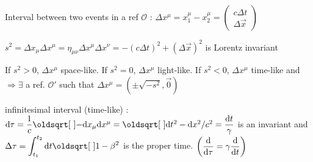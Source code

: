 \columnbreak
{}
\begin{squishlist}
\item Interval between two events in a ref $\mathcal{O}$ : $ \Delta x^{\mu} = x_1^{\mu} - x_2^{\mu} = \begin{pmatrix}
    c\Delta t \\
    \Delta \vec{x}
\end{pmatrix}$ 

\item $s^2 = \Delta x_\mu \Delta x^\mu = \eta_{\mu\nu} \Delta x^{\mu}\Delta x^{\nu} = -(c\Delta t)^2 + (\Delta \Vec{x})^2$ is Lorentz invariant

\item If $s^2>0$, $\Delta x^\mu$ space-like. If $s^2=0$, $\Delta x^\mu$ light-like. If $s^2<0$, $\Delta x^\mu$ time-like and $\Rightarrow \exists$ a ref. $\mathcal{O}'$ such that $\Delta x^{\mu} = \left( \pm \sqrt{-s^2} , \vec{0} \right)$\\

\item
infinitesimal interval (time-like) : $\ud \tau = \dfrac{1}{c}\sqrt{-\ud x_\mu\ud x^\mu} = \sqrt{\ud t^2 -\ud x^2/c^2} =\dfrac{\ud t}{\gamma} $
is an invariant and $\Delta\tau = {\displaystyle \int_{t_1}^{t_2}\ud t\sqrt{1-\beta^2} }$ is the proper time. $\left(\dfrac{\textrm{d} }{\textrm{d} \tau} = \gamma \dfrac{\textrm{d}}{\textrm{d} t}\right)$

\end{squishlist}
